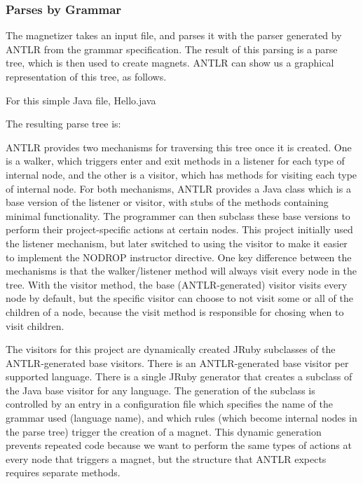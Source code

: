 \documentclass[letter,10pt]{article}
\begin{document}
\subsubsection{Parses by Grammar}

The magnetizer takes an input file, and parses it with the parser 
generated by ANTLR from the grammar specification. The result of this 
parsing is a parse tree, which is then used to create magnets. ANTLR 
can show us a graphical representation of this tree, as follows.

For this simple Java file, Hello.java

The resulting parse tree is:

\label{fig:parseTree}

ANTLR provides two mechanisms for traversing this tree once it is 
created. One is a walker, which triggers enter and exit methods in a 
listener for each type of internal node, and the other is a visitor, 
which has methods for visiting each type of internal node. For 
both mechanisms, ANTLR provides a Java class which is a base version of 
the listener or visitor, with stubs of the methods containing minimal 
functionality. The programmer can then subclass these base 
versions to perform their project-specific actions at certain nodes. 
This project initially used the listener mechanism, but later switched 
to using the visitor to make it easier to implement the NODROP 
instructor directive. One key difference between the mechanisms is that 
the walker/listener method will always visit every node in the tree. 
With the visitor method, the base (ANTLR-generated) visitor visits 
every node by default, but the specific visitor can choose to not visit 
some or all of the children of a node, because the visit method is 
responsible for chosing when to visit children.

The visitors for this project are dynamically created JRuby subclasses 
of the ANTLR-generated base visitors. There is an ANTLR-generated base 
visitor per supported language. There is a single JRuby generator that 
creates a subclass of the Java base visitor for any language. The 
generation of the subclass is controlled by an entry in a configuration 
file which specifies the name of the grammar used (language name), and 
which rules (which become internal nodes in the parse tree) trigger the 
creation of a magnet. This dynamic generation prevents repeated code 
because we want to perform the same types of actions at every node that 
triggers a magnet, but the structure that ANTLR expects requires 
separate methods.
\end{document}
